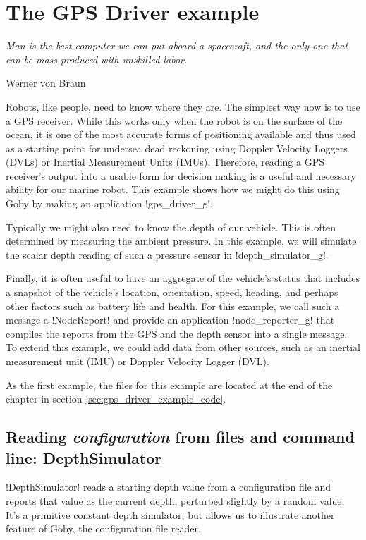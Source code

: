 \chapter{The GPS Driver example} \label{chap:gps_driver}
\MakeShortVerb{\!} %
\epigraph{\textit{Man is the best computer we can put aboard a spacecraft, and the only one that can be mass produced with unskilled labor.}}{Werner von Braun}

Robots, like people, need to know where they are. The simplest way now is to use a GPS receiver. While this works only when the robot is on the surface of the ocean, it is one of the most accurate forms of positioning available and thus used as a starting point for undersea dead reckoning using Doppler Velocity Loggers (DVLs) or Inertial Measurement Units (IMUs). Therefore, reading a GPS receiver's output into a usable form for decision making is a useful and necessary ability for our marine robot. This example shows how we might do this using Goby by making an application !gps_driver_g!.

Typically we might also need to know the depth of our vehicle. This is often determined by measuring the ambient pressure. In this example, we will simulate the scalar depth reading of such a pressure sensor in !depth_simulator_g!.

Finally, it is often useful to have an aggregate of the vehicle's status that includes a snapshot of the vehicle's location, orientation, speed, heading, and perhaps other factors such as battery life and health. For this example, we call such a message a !NodeReport! and provide an application !node_reporter_g! that compiles the reports from the GPS and the depth sensor into a single message. To extend this example, we could add data from other sources, such as an inertial measurement unit (IMU) or Doppler Velocity Logger (DVL).

As the first example, the files for this example are located at the end of the chapter in section \ref{sec:gps_driver_example_code}.

\section{Reading \textit{configuration} from files and command line: DepthSimulator}

!DepthSimulator! reads a starting depth value from a configuration file and reports that value as the current depth, perturbed slightly by a random value. It's a primitive constant depth simulator, but allows us to illustrate another feature of Goby, the configuration file reader.

